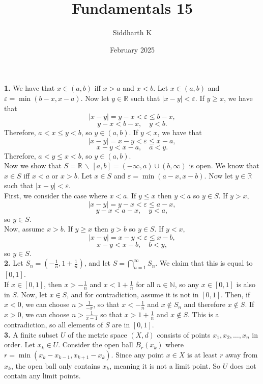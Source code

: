 \documentclass{article}
\title{Fundamentals 15}
\author{Siddharth K}
\date{February 2025}
\newcommand{\R}{\mathbb{R}}
\newcommand{\N}{\mathbb{N}}
\newcommand{\eps}{\varepsilon}
\begin{document}
\maketitle

\textbf{1.} We have that $x \in (a, b)$ iff $x > a$ and $x < b$. Let $x \in (a, b)$ and $\eps = \min(b - x, x - a)$. Now let $y \in \R$ such that $|x - y| < \eps$. If $y \ge x$, we have that
$$|x - y| = y - x < \eps \le b - x,$$
$$y - x < b - x, \quad y < b.$$
Therefore, $a < x \le y < b$, so $y \in (a, b)$. If $y < x$, we have that
$$|x - y| = x - y < \eps \le x - a,$$
$$x - y < x - a, \quad a < y.$$
Therefore, $a < y \le x < b$, so $y \in (a, b)$. \\

Now we show that $S = \R\, \backslash\, [a, b] = (-\infty, a) \cup (b, \infty)$ is open. We know that $x \in S$ iff $x < a$ or $x > b$. Let $x \in S$ and $\eps = \min(a - x, x - b)$. Now let $y \in \R$ such that $|x - y| < \eps$. \\

First, we consider the case where $x < a$. If $y \le x$ then $y < a$ so $y \in S$. If $y > x$,
$$|x - y| = y - x < \eps \le a - x,$$
$$y - x < a - x, \quad y < a,$$
so $y \in S$. \\

Now, assume $x > b$. If $y \ge x$ then $y > b$ so $y \in S$. If $y < x$,
$$|x - y| = x - y < \eps \le x - b,$$
$$x - y < x - b, \quad b < y,$$
so $y \in S$. \\

\textbf{2.} Let $S_n = \left(-\frac{1}{n}, 1 + \frac{1}{n}\right)$, and let $S = \bigcap_{n = 1}^\infty S_n$. We claim that this is equal to $[0, 1]$. \\

If $x \in [0, 1]$, then $x > -\frac{1}{n}$ and $x < 1 + \frac{1}{n}$ for all $n \in \N$, so any $x \in [0, 1]$ is also in $S$. Now, let $x \in S$, and for contradiction, assume it is not in $[0, 1]$. Then, if $x < 0$, we can choose $n > \frac{1}{-x}$, so that $x < -\frac{1}{n}$ and $x \not\in S_n$ and therefore $x \not\in S$. If $x > 0$, we can choose $n > \frac{1}{x - 1}$ so that $x > 1 + \frac{1}{n}$ and $x \not\in S$. This is a contradiction, so all elements of $S$ are in $[0, 1]$. \\

\textbf{3.} A finite subset $U$ of the metric space $(X, d)$ consists of points $x_1, x_2, \ldots, x_n$ in order. Let $x_k \in U$. Consider the open ball $B_r(x_k)$ where $r = \min(x_k - x_{k - 1}, x_{k + 1} - x_k)$. Since any point $x \in X$ is at least $r$ away from $x_k$, the open ball only contains $x_k$, meaning it is not a limit point. So $U$ does not contain any limit points. \\
\end{document}
